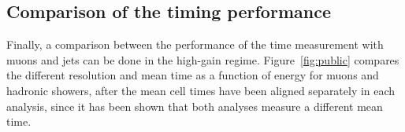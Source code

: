 
\subsection{Comparison of the timing performance}
Finally, a comparison between the performance of the time measurement
with muons and jets can be done in the high-gain
regime.
Figure~\ref{fig:public} compares the different resolution and
mean time as a function of energy for muons and hadronic showers,
after the mean cell times have been aligned separately in each analysis, 
since it has been shown that both analyses measure a different mean time.

